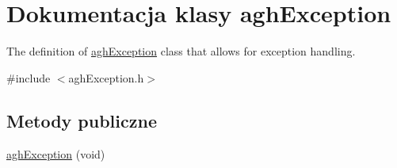 \hypertarget{classaghException}{\section{Dokumentacja klasy agh\-Exception}
\label{classaghException}
}


The definition of \hyperlink{classaghException}{agh\-Exception} class that allows for exception handling.  




{\ttfamily \#include $<$agh\-Exception.\-h$>$}

\subsection*{Metody publiczne}
\begin{DoxyCompactItemize}
\item 
\hypertarget{classaghException_a4823634f8bfb0fe7338b49f0e26fc90a}{\hyperlink{classaghException_a4823634f8bfb0fe7338b49f0e26fc90a}{agh\-Exception} (void)}\label{classaghException_a4823634f8bfb0fe7338b49f0e26fc90a}


\end{DoxyCompactItemize}
